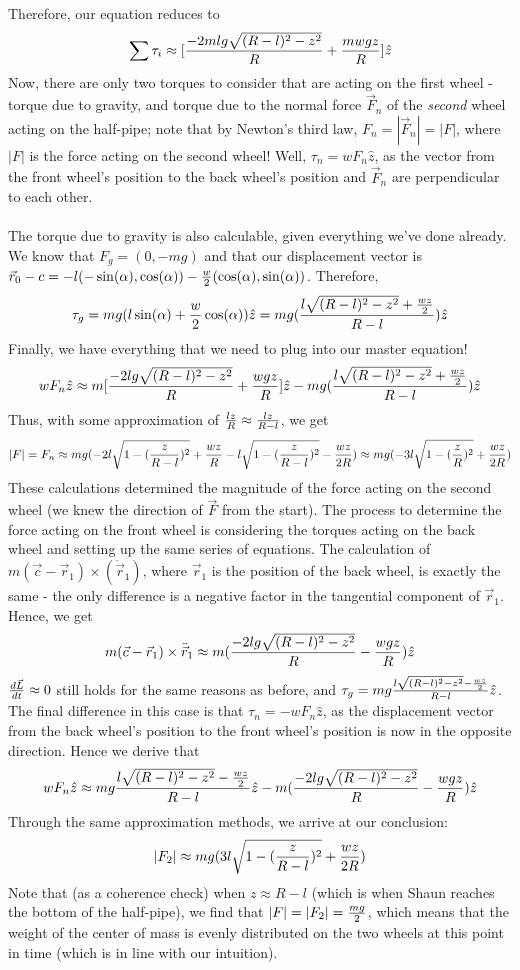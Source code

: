 Therefore, our equation reduces to
$$\sum \tau_i\approx [\frac{-2mlg\sqrt{(R-l)^2-z^2}}{R}+\frac{mwgz}{R}]\hat z$$
Now, there are only two torques to consider that are acting on the first wheel - torque due to gravity, and torque due to the normal force $\vec F_n$ of the \textit{second} wheel acting on the half-pipe; note that by Newton's third law, $F_n=|\vec F_n|=|F|$, where $|F|$ is the force acting on the second wheel!  Well, $\tau_n=w F_n \hat z$, as the vector from the front wheel's position to the back wheel's position and $\vec F_n$ are perpendicular to each other.   
\\\\ The torque due to gravity is also calculable, given everything we've done already.  We know that $F_g=(0, -mg)$ and that our displacement vector is $\vec r_0-c=-l(-\sin(\alpha), \cos(\alpha))-\frac w 2(\cos(\alpha), \sin(\alpha))$.  Therefore, 
$$\tau_g=mg(l\sin(\alpha)+\frac w 2 \cos(\alpha))\hat z=mg(\frac{l\sqrt{(R-l)^2-z^2}+\frac {wz}{2}}{R-l})\hat z$$
Finally, we have everything that we need to plug into our master equation!
$$w F_n \hat z\approx  m[\frac{-2lg\sqrt{(R-l)^2-z^2}}{R}+\frac{wgz}{R}]\hat z-mg(\frac{l\sqrt{(R-l)^2-z^2}+\frac {wz}{2}}{R-l})\hat z$$
Thus, with some approximation of $\frac {lz} R\approx \frac {lz}{R-l}$, we get
$$|F|=F_n\approx mg(-2l\sqrt{1-(\frac z {R-l})^2}+ \frac {wz}{R}-l\sqrt{1-(\frac z {R-l})^2}- \frac {wz}{2R})\approx mg(-3l\sqrt{1-(\frac z R)^2}+\frac{wz}{2R})$$
These calculations determined the magnitude of the force acting on the second wheel (we knew the direction of $\vec F$ from the start).  The process to determine the force acting on the front wheel is considering the torques acting on the back wheel and setting up the same series of equations.  The calculation of $m(\vec c - \vec r_1)\times (\ddot {\vec r}_1)$, where $\vec r_1$ is the position of the back wheel, is exactly the same - the only difference is a negative factor in the tangential component of $\vec r_1$.  Hence, we get
$$m(\vec c-\vec r_1)\times \ddot{\vec r}_1\approx m(\frac{-2lg\sqrt{(R-l)^2-z^2}}{R}-\frac {wgz}R)\hat z$$
$\frac{d\vec L}{dt}\approx 0$ still holds for the same reasons as before, and $\tau_g=mg\frac{l\sqrt{(R-l)^2-z^2}-\frac {wz}2}{R-l} \hat z$.  The final difference in this case is that $\tau_n=-wF_n \hat z$, as the displacement vector from the back wheel's position to the front wheel's position is now in the opposite direction.  Hence we derive that
$$w F_n \hat z\approx mg\frac{l\sqrt{(R-l)^2-z^2}-\frac {wz}2}{R-l} \hat z-m(\frac{-2lg\sqrt{(R-l)^2-z^2}}{R}-\frac {wgz}R)\hat z$$
Through the same approximation methods, we arrive at our conclusion:
$$|F_2|\approx mg(3l\sqrt{1-(\frac z {R-l})^2}+\frac{wz}{2R})$$
Note that (as a coherence check) when $z\approx R-l$ (which is when Shaun reaches the bottom of the half-pipe), we find that $|F|=|F_2|=\frac {mg}2$, which means that the weight of the center of mass is evenly distributed on the two wheels at this point in time (which is in line with our intuition).  


